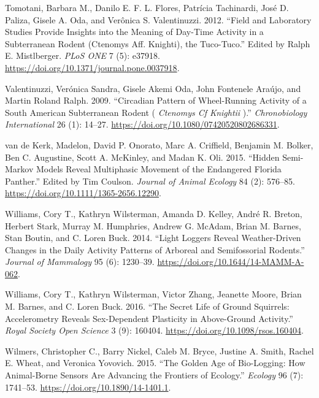 \documentclass[msc,numbers,hidelinks]{coppe}
\newlength{\cslhangindent}
\newenvironment{CSLReferences}[2] %
 {%
  \setlength{\parindent}{0pt}
  \ifodd #1 \everypar{\setlength{\hangindent}{\cslhangindent}}\ignorespaces\fi
  \ifnum #2 > 0
  \setlength{\parskip}{#2\baselineskip}
  \fi
 }%
 {}
\begin{document}
\begin{CSLReferences}{1}{0}
  \leavevmode{}%
  Tomotani, Barbara M., Danilo E. F. L. Flores, Patrícia Tachinardi, José D. Paliza, Gisele A. Oda, and Verônica S. Valentinuzzi. 2012. {``Field and Laboratory Studies Provide Insights into the Meaning of Day-Time Activity in a Subterranean Rodent (Ctenomys Aff. Knighti), the Tuco-Tuco.''} Edited by Ralph E. Mistlberger. \emph{PLoS ONE} 7 (5): e37918. \url{https://doi.org/10.1371/journal.pone.0037918}.

  \leavevmode{}%
  Valentinuzzi, Verónica Sandra, Gisele Akemi Oda, John Fontenele Araújo, and Martin Roland Ralph. 2009. {``Circadian Pattern of Wheel{-}Running Activity of a South American Subterranean Rodent ( {\emph{Ctenomys Cf Knightii}} ).''} \emph{Chronobiology International} 26 (1): 14--27. \url{https://doi.org/10.1080/07420520802686331}.

  \leavevmode{}%
  van de Kerk, Madelon, David P. Onorato, Marc A. Criffield, Benjamin M. Bolker, Ben C. Augustine, Scott A. McKinley, and Madan K. Oli. 2015. {``Hidden Semi-Markov Models Reveal Multiphasic Movement of the Endangered Florida Panther.''} Edited by Tim Coulson. \emph{Journal of Animal Ecology} 84 (2): 576--85. \url{https://doi.org/10.1111/1365-2656.12290}.

  \leavevmode{}%
  Williams, Cory T., Kathryn Wilsterman, Amanda D. Kelley, André R. Breton, Herbert Stark, Murray M. Humphries, Andrew G. McAdam, Brian M. Barnes, Stan Boutin, and C. Loren Buck. 2014. {``Light Loggers Reveal Weather-Driven Changes in the Daily Activity Patterns of Arboreal and Semifossorial Rodents.''} \emph{Journal of Mammalogy} 95 (6): 1230--39. \url{https://doi.org/10.1644/14-MAMM-A-062}.

  \leavevmode{}%
  Williams, Cory T., Kathryn Wilsterman, Victor Zhang, Jeanette Moore, Brian M. Barnes, and C. Loren Buck. 2016. {``The Secret Life of Ground Squirrels: Accelerometry Reveals Sex-Dependent Plasticity in Above-Ground Activity.''} \emph{Royal Society Open Science} 3 (9): 160404. \url{https://doi.org/10.1098/rsos.160404}.

  \leavevmode{}%
  Wilmers, Christopher C., Barry Nickel, Caleb M. Bryce, Justine A. Smith, Rachel E. Wheat, and Veronica Yovovich. 2015. {``The Golden Age of Bio-Logging: How Animal-Borne Sensors Are Advancing the Frontiers of Ecology.''} \emph{Ecology} 96 (7): 1741--53. \url{https://doi.org/10.1890/14-1401.1}.


\end{CSLReferences}
\end{document}
